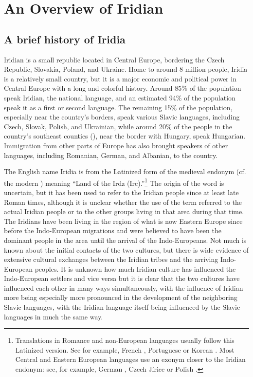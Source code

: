 \chapter{An Overview of Iridian}

\section{A brief history of Iridia}

Iridian is a small republic located in Central Europe, bordering the Czech
Republic, Slovakia, Poland, and Ukraine. Home to around 8 million people, Iridia
is a relatively small country, but it is a major economic and political power in
Central Europe with a long and colorful history. Around 85\% of the population
speak Iridian, the national language, and an estimated 94\% of the population
speak it as a first or second language. The remaining 15\% of the population,
especially near the country's borders, speak various Slavic languages, including
Czech, Slovak, Polish, and Ukrainian, while around 20\% of the people in the
country's southeast counties (), near the border with Hungary, speak
Hungarian. Immigration from other parts of Europe has also brought speakers of
other languages, including Romanian, German, and Albanian, to the country.

The English name Iridia is from the Latinized form of the medieval endonym
     (cf. the modern ) meaning ``Land of the Irdz
    (Irc).''\footnote{ Translations in Romance and non-European languages
    usually follow this Latinized version. See for example, French
    , Portuguese  or Korean .
    Most Central and Eastern European languages use an exonym closer to the
    Iridian endonym: see, for example, German , Czech Jírice
    or Polish .} The origin of the word  is uncertain,
    but it has been used to refer to the Iridian people since at least late
    Roman times, although it is unclear whether the use of the term referred to
    the actual Iridian people or to the other groups living in that area during
    that time. The Iridians have been living in the region of what is now
    Eastern Europe since before the Indo-European migrations and were believed
    to have been the dominant people in the area until the arrival of the
    Indo-Europeans. Not much is known about the initial contacts of the two
    cultures, but there is wide evidence of extensive cultural exchanges between
    the Iridian tribes and the arriving Indo-European peoples. It is unknown how
    much Iridian culture has influenced the Indo-European settlers and vice
    versa but it is clear that the two cultures have influenced each other in
    many ways simultaneously, with the influence of Iridian more being
    especially more pronounced in the development of the neighboring Slavic
    languages, with the Iridian language itself being influenced by the Slavic
    languages in much the same way.

